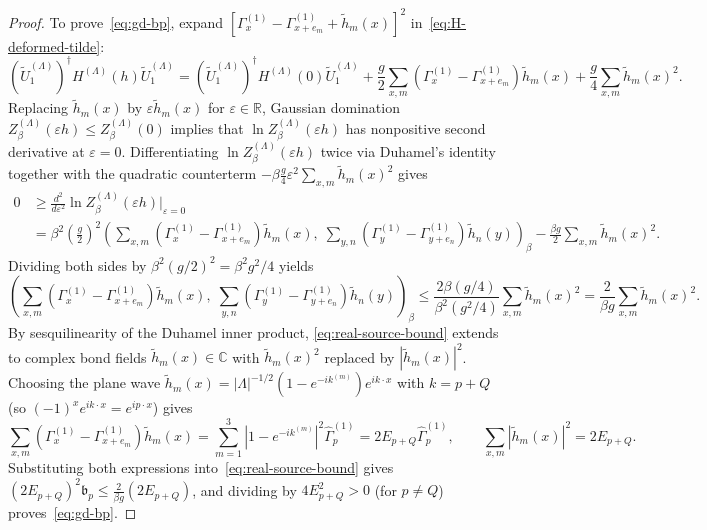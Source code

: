 \documentclass[11pt]{article}
\theoremstyle{definition}
\theoremstyle{remark}
\newcommand{\bbR}{\mathbb{R}}
\newcommand{\bbC}{\mathbb{C}}
\begin{document}
\begin{proof}
To prove~\eqref{eq:gd-bp}, expand $[\Gamma_x^{(1)} - \Gamma_{x+e_m}^{(1)} + \tilde{h}_m(x)]^2$ in~\eqref{eq:H-deformed-tilde}:
\begin{equation}\label{eq:H-expand}
(\tilde{U}_1^{(\Lambda)})^\dagger H^{(\Lambda)}(h) \tilde{U}_1^{(\Lambda)} = (\tilde{U}_1^{(\Lambda)})^\dagger H^{(\Lambda)}(0) \tilde{U}_1^{(\Lambda)} + \frac{g}{2} \sum_{x,m} (\Gamma_x^{(1)} - \Gamma_{x+e_m}^{(1)})\tilde{h}_m(x) + \frac{g}{4} \sum_{x,m} \tilde{h}_m(x)^2.
\end{equation}
Replacing $\tilde{h}_m(x)$ by $\varepsilon \tilde{h}_m(x)$ for $\varepsilon \in \bbR$, Gaussian domination $Z_\beta^{(\Lambda)}(\varepsilon h) \le Z_\beta^{(\Lambda)}(0)$ implies that $\ln Z_\beta^{(\Lambda)}(\varepsilon h)$ has nonpositive second derivative at $\varepsilon = 0$. Differentiating $\ln Z_\beta^{(\Lambda)}(\varepsilon h)$ twice via Duhamel's identity together with the quadratic counterterm $-\beta\frac{g}{4}\varepsilon^2 \sum_{x,m}\tilde{h}_m(x)^2$ gives
\begin{equation}\label{eq:duhamel-2nd}
\begin{split}
0 &\ge \frac{d^2}{d\varepsilon^2}\ln Z_\beta^{(\Lambda)}(\varepsilon h)\Big|_{\varepsilon=0} \\
&= \beta^2 \left(\frac{g}{2}\right)^2 \left(\sum_{x,m}(\Gamma_x^{(1)}-\Gamma_{x+e_m}^{(1)})\tilde{h}_m(x),\; \sum_{y,n}(\Gamma_y^{(1)}-\Gamma_{y+e_n}^{(1)})\tilde{h}_n(y)\right)_\beta - \frac{\beta g}{2} \sum_{x,m} \tilde{h}_m(x)^2.
\end{split}
\end{equation}
Dividing both sides by $\beta^2 (g/2)^2 = \beta^2 g^2 / 4$ yields
\begin{equation}\label{eq:real-source-bound}
\left(\sum_{x,m}(\Gamma_x^{(1)}-\Gamma_{x+e_m}^{(1)})\tilde{h}_m(x),\; \sum_{y,n}(\Gamma_y^{(1)}-\Gamma_{y+e_n}^{(1)})\tilde{h}_n(y)\right)_\beta \le \frac{2\beta(g/4)}{\beta^2(g^2/4)} \sum_{x,m} \tilde{h}_m(x)^2 = \frac{2}{\beta g} \sum_{x,m} \tilde{h}_m(x)^2.
\end{equation}
By sesquilinearity of the Duhamel inner product, \eqref{eq:real-source-bound} extends to complex bond fields $\tilde{h}_m(x) \in \bbC$ with $\tilde{h}_m(x)^2$ replaced by $|\tilde{h}_m(x)|^2$. Choosing the plane wave $\tilde{h}_m(x) = |\Lambda|^{-1/2} (1 - e^{-i k^{(m)}}) e^{ik\cdot x}$ with $k = p + Q$ (so $(-1)^x e^{ik\cdot x} = e^{ip\cdot x}$) gives
\begin{equation*}
\sum_{x,m} (\Gamma_x^{(1)} - \Gamma_{x+e_m}^{(1)}) \tilde{h}_m(x) = \sum_{m=1}^3 |1 - e^{-ik^{(m)}}|^2 \hat{\Gamma}_p^{(1)} = 2 E_{p+Q} \hat{\Gamma}_p^{(1)}, \qquad \sum_{x,m} |\tilde{h}_m(x)|^2 = 2 E_{p+Q}.
\end{equation*}
Substituting both expressions into~\eqref{eq:real-source-bound} gives $(2 E_{p+Q})^2 \mathfrak{b}_p \le \frac{2}{\beta g}(2 E_{p+Q})$, and dividing by $4 E_{p+Q}^2 > 0$ (for $p \ne Q$) proves~\eqref{eq:gd-bp}.
\end{proof}
\end{document}
